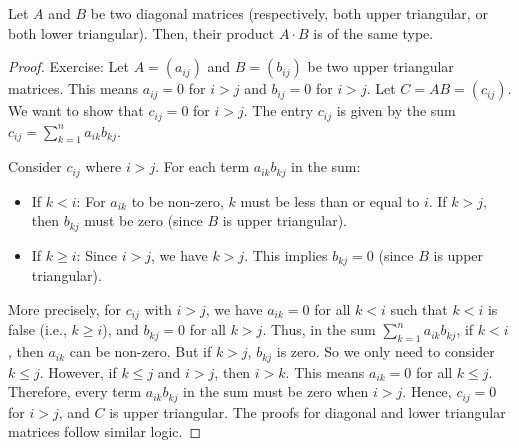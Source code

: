 \begin{lemma}
\label{lemma:triangular_multiplication_closure}
Let $A$ and $B$ be two diagonal matrices (respectively, both upper triangular, or both lower triangular). Then, their product $A \cdot B$ is of the same type.
\end{lemma}

\begin{proof}
  Exercise: Let $A = (a_{ij})$ and $B = (b_{ij})$ be two upper triangular matrices. This means $a_{ij} = 0$ for $i > j$ and $b_{ij} = 0$ for $i > j$.
  Let $C = AB = (c_{ij})$. We want to show that $c_{ij} = 0$ for $i > j$.
  The entry $c_{ij}$ is given by the sum $c_{ij} = \sum_{k=1}^n a_{ik} b_{kj}$.

  Consider $c_{ij}$ where $i > j$. For each term $a_{ik} b_{kj}$ in the sum:
  \begin{itemize}
    \item If $k < i$: For $a_{ik}$ to be non-zero, $k$ must be less than or equal to $i$. If $k > j$, then $b_{kj}$ must be zero (since $B$ is upper triangular).
    \item If $k \ge i$: Since $i > j$, we have $k > j$. This implies $b_{kj} = 0$ (since $B$ is upper triangular).
  \end{itemize}
  More precisely, for $c_{ij}$ with $i > j$, we have $a_{ik} = 0$ for all $k < i$ such that $k < i$ is false (i.e., $k \ge i$), and $b_{kj} = 0$ for all $k > j$.
  Thus, in the sum $\sum_{k=1}^n a_{ik} b_{kj}$, if $k < i$, then $a_{ik}$ can be non-zero. But if $k > j$, $b_{kj}$ is zero. So we only need to consider $k \le j$.
  However, if $k \le j$ and $i > j$, then $i > k$. This means $a_{ik} = 0$ for all $k \le j$.
  Therefore, every term $a_{ik}b_{kj}$ in the sum must be zero when $i > j$. Hence, $c_{ij} = 0$ for $i > j$, and $C$ is upper triangular.
  The proofs for diagonal and lower triangular matrices follow similar logic.
\end{proof}

